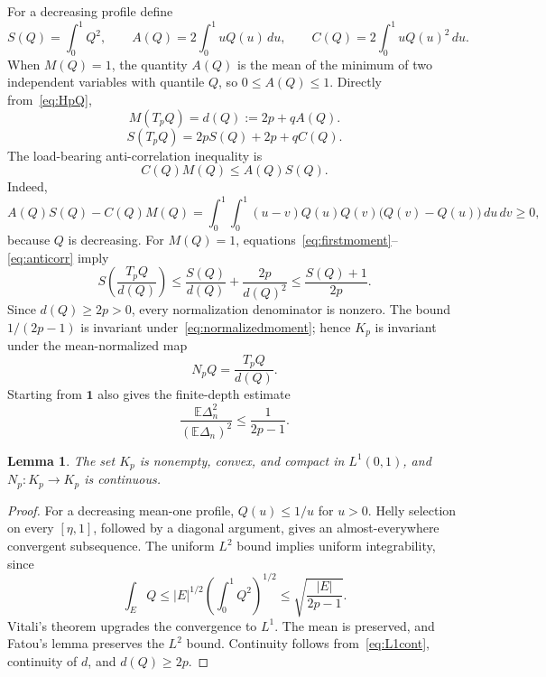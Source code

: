 \documentclass[a4paper,11pt]{amsart}
\newtheorem{lemma}[theorem]{Lemma}
\theoremstyle{remark}
\begin{document}
For a decreasing profile define
\[
 S(Q)=\int_0^1Q^2,\qquad
 A(Q)=2\int_0^1uQ(u)\,du,\qquad
 C(Q)=2\int_0^1uQ(u)^2\,du.
\]
When $M(Q)=1$, the quantity $A(Q)$ is the mean of the minimum of two independent variables with quantile $Q$, so $0\le A(Q)\le1$. Directly from~\eqref{eq:HpQ},
\begin{equation}\label{eq:firstmoment}
 M(T_pQ)=d(Q):=2p+qA(Q).
\end{equation}
\begin{equation}\label{eq:secondmoment}
 S(T_pQ)=2pS(Q)+2p+qC(Q).
\end{equation}
The load-bearing anti-correlation inequality is
\begin{equation}\label{eq:anticorr}
 C(Q)M(Q)\le A(Q)S(Q).
\end{equation}
Indeed,
\[
 A(Q)S(Q)-C(Q)M(Q)
 =\int_0^1\!\int_0^1
 (u-v)Q(u)Q(v)\bigl(Q(v)-Q(u)\bigr)\,du\,dv\ge0,
\]
because $Q$ is decreasing. For $M(Q)=1$, equations~\eqref{eq:firstmoment}--\eqref{eq:anticorr} imply
\begin{equation}\label{eq:normalizedmoment}
 S\left(\frac{T_pQ}{d(Q)}\right)
 \le\frac{S(Q)}{d(Q)}+\frac{2p}{d(Q)^2}
 \le\frac{S(Q)+1}{2p}.
\end{equation}
Since $d(Q)\ge2p>0$, every normalization denominator is nonzero. The bound $1/(2p-1)$ is invariant under~\eqref{eq:normalizedmoment}; hence $K_p$ is invariant under the mean-normalized map
\[
 N_pQ=\frac{T_pQ}{d(Q)}.
\]
Starting from $\mathbf1$ also gives the finite-depth estimate
\begin{equation}\label{eq:L2bound}
 \frac{\mathbb E\Delta_n^2}{(\mathbb E\Delta_n)^2}\le\frac1{2p-1}.
\end{equation}

\begin{lemma}\label{lem:compact}
The set $K_p$ is nonempty, convex, and compact in $L^1(0,1)$, and $N_p:K_p\to K_p$ is continuous.
\end{lemma}

\begin{proof}
For a decreasing mean-one profile, $Q(u)\le1/u$ for $u>0$. Helly selection on every $[\eta,1]$, followed by a diagonal argument, gives an almost-everywhere convergent subsequence. The uniform $L^2$ bound implies uniform integrability, since
\[
 \int_EQ\le |E|^{1/2}\left(\int_0^1Q^2\right)^{1/2}
 \le\sqrt{\frac{|E|}{2p-1}}.
\]
Vitali's theorem upgrades the convergence to $L^1$. The mean is preserved, and Fatou's lemma preserves the $L^2$ bound. Continuity follows from~\eqref{eq:L1cont}, continuity of $d$, and $d(Q)\ge2p$.
\end{proof}
\end{document}
